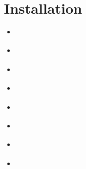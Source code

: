 \documentclass[letterpaper,10pt,french]{sphinxmanual}
\begin{document}
\sphinxstepscope


\section{Installation}
\label{\detokenize{doc_instal/installation:installation}}\label{\detokenize{doc_instal/installation::doc}}
\begin{sphinxShadowBox}
\begin{itemize}
\item {} 
\sphinxAtStartPar
{}\label{\detokenize{doc_instal/installation:id1}}{\hyperref[\detokenize{doc_instal/installation:introduction}]{}}

\item {} 
\sphinxAtStartPar
{}\label{\detokenize{doc_instal/installation:id2}}{\hyperref[\detokenize{doc_instal/installation:ansible}]{}}

\item {} 
\sphinxAtStartPar
{}\label{\detokenize{doc_instal/installation:id3}}{\hyperref[\detokenize{doc_instal/installation:erreurs-frequentes}]{}}

\item {} 
\sphinxAtStartPar
{}\label{\detokenize{doc_instal/installation:id4}}{\hyperref[\detokenize{doc_instal/installation:serveur-mail}]{}}

\item {} 
\sphinxAtStartPar
{}\label{\detokenize{doc_instal/installation:id5}}{\hyperref[\detokenize{doc_instal/installation:script-de-personnalisation}]{}}

\item {} 
\sphinxAtStartPar
{}\label{\detokenize{doc_instal/installation:id6}}{\hyperref[\detokenize{doc_instal/installation:thesaurus}]{}}

\item {} 
\sphinxAtStartPar
{}\label{\detokenize{doc_instal/installation:id7}}{\hyperref[\detokenize{doc_instal/installation:activer-le-module-analytics}]{}}

\item {} 
\sphinxAtStartPar
{}\label{\detokenize{doc_instal/installation:id8}}{\hyperref[\detokenize{doc_instal/installation:certificat-ssl}]{}}


\end{itemize}
\end{sphinxShadowBox}
\end{document}
